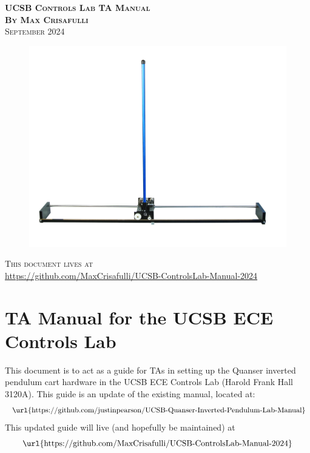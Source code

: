 \documentclass[11pt,letterpaper]{article}
\begin{document}
\begin{center}
  \Huge{\textsc{\textbf{UCSB Controls Lab TA Manual}}}
  \vspace{0.5cm}
  \\ \textbf{\textsc{By} \large{\textsc{Max Crisafulli}}}
  \vspace{0.2cm}
  \\ \textsc{September 2024}

  \vspace{\fill}

\begin{figure}[H]
    \centering
    \includegraphics[width=1\textwidth]{./Figures/IP02-Inverted-Pendulum_graphics.jpg}
\end{figure}

\vspace{\fill}


\textsc{This document lives at} \\
\url{https://github.com/MaxCrisafulli/UCSB-ControlsLab-Manual-2024}
\end{center}
\thispagestyle{empty}

\newpage
\phantom{}
\thispagestyle{empty}
\newpage
\setcounter{page}{1}


\section{TA Manual for the UCSB ECE Controls Lab}
This document is to act as a guide for TAs in setting up the Quanser inverted pendulum cart hardware in the UCSB ECE Controls Lab (Harold Frank Hall 3120A). This guide is an update of the existing manual, located at:
\[ \text{ \url{https://github.com/justinpearson/UCSB-Quanser-Inverted-Pendulum-Lab-Manual}}\]
This updated guide will live (and hopefully be maintained) at 
\[\text{\url{https://github.com/MaxCrisafulli/UCSB-ControlsLab-Manual-2024}}\]
\end{document}
